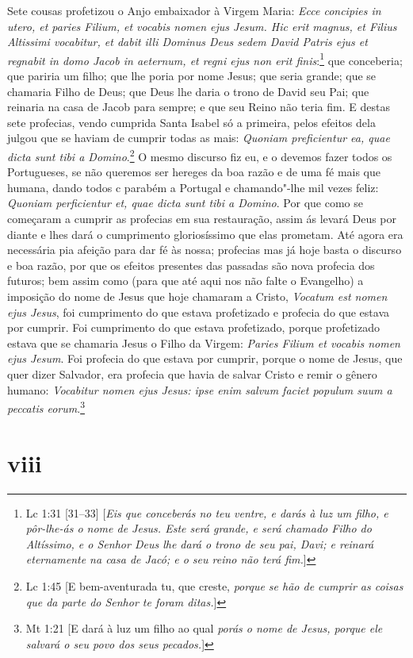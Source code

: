 Sete cousas profetizou o Anjo embaixador à Virgem Maria: \emph{Ecce
concipies in utero, et paries Filium, et vocabis nomen ejus Jesum. Hic
erit magnus, et Filius Altissimi vocabitur, et dabit illi Dominus Deus
sedem David Patris ejus et regnabit in domo Jacob in aeternum, et regni
ejus non erit finis}:\footnote{Lc 1:31 [31--33] [\textit{Eis que conceberás no teu ventre, e darás à luz um filho, e pôr-lhe-ás o nome de Jesus. Este será grande, e será chamado Filho do Altíssimo, e o Senhor Deus lhe dará o trono de seu pai, Davi; e reinará eternamente na casa de Jacó; e o seu reino não terá fim.}]} que conceberia; que pariria um filho; que lhe
poria por nome Jesus; que seria grande; que se chamaria Filho de Deus;
que Deus lhe daria o trono de David seu Pai; que reinaria na casa de
Jacob para sempre; e que seu Reino não teria fim. E destas sete
profecias, vendo cumprida Santa Isabel só a primeira, pelos efeitos dela
julgou que se haviam de cumprir todas as mais: \emph{Quoniam
preficientur ea, quae dicta sunt tibi a Domino}.\footnote{Lc 1:45 [E bem-aventurada tu, que creste, \textit{porque se hão de cumprir as coisas que da parte do Senhor te foram ditas.}]} O mesmo discurso fiz
eu, e o devemos fazer todos os Portugueses, se não queremos ser hereges
da boa razão e de uma fé mais que humana, dando todos c parabém a
Portugal e chamando"-lhe mil vezes feliz: \emph{Quoniam perficientur et,
quae dicta sunt tibi a Domino}. Por que como se começaram a cumprir as
profecias em sua restauração, assim ás levará Deus por diante e lhes
dará o cumprimento gloriosíssimo que elas prometam. Até agora era
necessária pia afeição para dar fé às nossa; profecias mas já hoje basta
o discurso e boa razão, por que os efeitos presentes das passadas são
nova profecia dos futuros; bem assim como (para que até aqui nos não
falte o Evangelho) a imposição do nome de Jesus que hoje chamaram a
Cristo, \emph{Vocatum est nomen ejus Jesus}, foi cumprimento do que
estava profetizado e profecia do que estava por cumprir. Foi cumprimento
do que estava profetizado, porque profetizado estava que se chamaria
Jesus o Filho da Virgem: \emph{Paries Filium et vocabis nomen ejus
Jesum}. Foi profecia do que estava por cumprir, porque o nome de Jesus,
que quer dizer Salvador, era profecia que havia de salvar Cristo e remir
o gênero humano: \emph{Vocabitur nomen ejus Jesus: ipse enim salvum
faciet populum suum a peccatis eorum}.\footnote{Mt 1:21 [E dará à luz um filho ao qual \textit{porás o nome de Jesus, porque ele salvará o seu povo dos seus pecados.}]}

\section*{viii}

